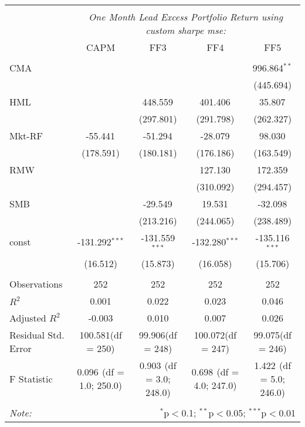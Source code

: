 \begin{table}[!htbp] \centering
\begin{tabular}{@{\extracolsep{5pt}}lcccc}
\\[-1.8ex]\hline
\hline \\[-1.8ex]
& \multicolumn{4}{c}{\textit{One Month Lead Excess Portfolio Return using custom sharpe mse:}} \
\cr \cline{4-5}
\\[-1.8ex] & CAPM & FF3 & FF4 & FF5 \\
\hline \\[-1.8ex]
 CMA & & & & 996.864$^{**}$ \\
  & & & & (445.694) \\
 HML & & 448.559$^{}$ & 401.406$^{}$ & 35.807$^{}$ \\
  & & (297.801) & (291.798) & (262.327) \\
 Mkt-RF & -55.441$^{}$ & -51.294$^{}$ & -28.079$^{}$ & 98.030$^{}$ \\
  & (178.591) & (180.181) & (176.186) & (163.549) \\
 RMW & & & 127.130$^{}$ & 172.359$^{}$ \\
  & & & (310.092) & (294.457) \\
 SMB & & -29.549$^{}$ & 19.531$^{}$ & -32.098$^{}$ \\
  & & (213.216) & (244.065) & (238.489) \\
 const & -131.292$^{***}$ & -131.559$^{***}$ & -132.280$^{***}$ & -135.116$^{***}$ \\
  & (16.512) & (15.873) & (16.058) & (15.706) \\
\hline \\[-1.8ex]
 Observations & 252 & 252 & 252 & 252 \\
 $R^2$ & 0.001 & 0.022 & 0.023 & 0.046 \\
 Adjusted $R^2$ & -0.003 & 0.010 & 0.007 & 0.026 \\
 Residual Std. Error & 100.581(df = 250) & 99.906(df = 248) & 100.072(df = 247) & 99.075(df = 246)  \\
 F Statistic & 0.096$^{}$ (df = 1.0; 250.0) & 0.903$^{}$ (df = 3.0; 248.0) & 0.698$^{}$ (df = 4.0; 247.0) & 1.422$^{}$ (df = 5.0; 246.0) \\
\hline
\hline \\[-1.8ex]
\textit{Note:} & \multicolumn{4}{r}{$^{*}$p$<$0.1; $^{**}$p$<$0.05; $^{***}$p$<$0.01} \\
\end{tabular}
\end{table}
